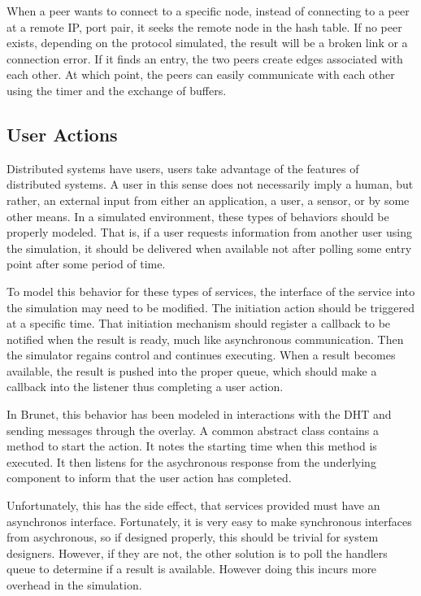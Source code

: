 When a peer wants to connect to a specific node, instead of connecting to a
peer at a remote IP, port pair, it seeks the remote node in the hash table.  If
no peer exists, depending on the protocol simulated, the result will be a
broken link or a connection error.  If it finds an entry, the two peers create
edges associated with each other.  At which point, the peers can easily
communicate with each other using the timer and the exchange of buffers.

\subsection{User Actions}

Distributed systems have users, users take advantage of the features of
distributed systems.  A user in this sense does not necessarily imply a human,
but rather, an external input from either an application, a user, a sensor, or
by some other means.  In a simulated environment, these types of behaviors
should be properly modeled.  That is, if a user requests information from
another user using the simulation, it should be delivered when available not
after polling some entry point after some period of time.

To model this behavior for these types of services, the interface of the
service into the simulation may need to be modified.  The initiation action
should be triggered at a specific time.  That initiation mechanism should
register a callback to be notified when the result is ready, much like
asynchronous communication.  Then the simulator regains control and continues
executing.  When a result becomes available, the result is pushed into the
proper queue, which should make a callback into the listener thus completing a
user action.

In Brunet, this behavior has been modeled in interactions with the DHT and
sending messages through the overlay.  A common abstract class contains a
method to start the action.  It notes the starting time when this method is
executed.  It then listens for the asychronous response from the underlying
component to inform that the user action has completed.

Unfortunately, this has the side effect, that services provided must have an
asynchronos interface.  Fortunately, it is very easy to make synchronous
interfaces from asychronous, so if designed properly, this should be trivial
for system designers.  However, if they are not, the other solution is to poll
the handlers queue to determine if a result is available.  However doing this
incurs more overhead in the simulation.

